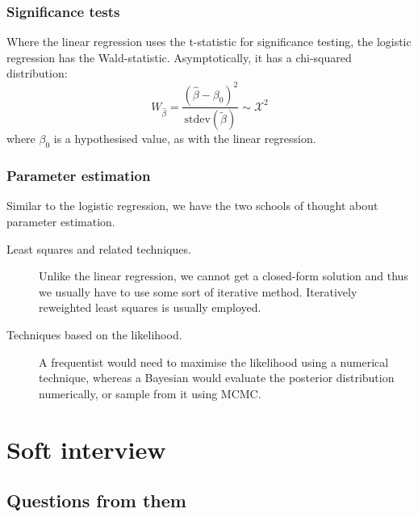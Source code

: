 \documentclass[a4paper]{article}
\begin{document}
\subsubsection{Significance tests}
Where the linear regression uses the t-statistic for significance testing, the logistic regression has the Wald-statistic. Asymptotically, it has a chi-squared distribution:
\[
W_{\hat\beta} =
\frac{(\hat\beta - \beta_0)^2}{ \text{stdev}( \tilde\beta) }
\sim \mathcal{X}^2
\]
where $\beta_0$ is a hypothesised value, as with the linear regression.



\subsubsection{Parameter estimation}

Similar to the logistic regression, we have the two schools of thought about parameter estimation.
\begin{description}
  \item[Least squares and related techniques.]
    Unlike the linear regression, we cannot get a closed-form solution and thus we usually have to use some sort of iterative method. Iteratively reweighted least squares is usually employed.
  \item[Techniques based on the likelihood.]
  A frequentist would need to maximise the likelihood using a numerical technique, whereas a Bayesian would evaluate the posterior distribution numerically, or sample from it using MCMC.
\end{description}



\section{Soft interview}

\subsection{Questions from them}
\end{document}
